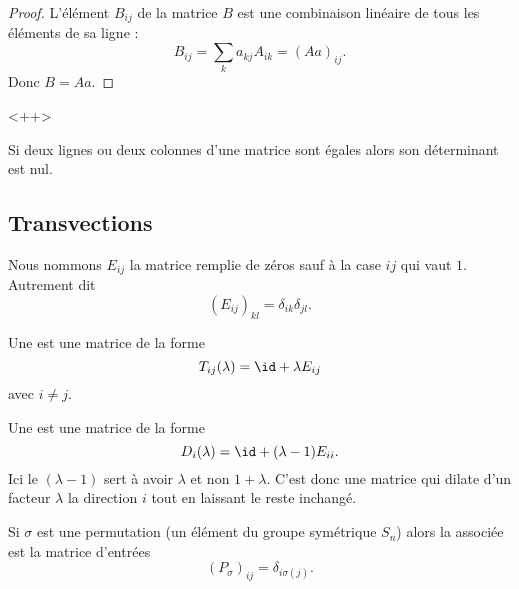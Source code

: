 \begin{proof}
    L'élément \( B_{ij}\) de la matrice \( B\) est une combinaison linéaire de tous les éléments de sa ligne :
    \begin{equation}
        B_{ij}=\sum_ka_{kj}A_{ik}=(Aa)_{ij}.
    \end{equation}
    Donc \( B=Aa\).
\end{proof}
<++>


\begin{proposition}     \label{PROPooLOQMooQzrZLH}
    Si deux lignes ou deux colonnes d'une matrice sont égales alors son déterminant est nul.
\end{proposition}

\subsection{Transvections}

Nous nommons \( E_{ij}\) la matrice remplie de zéros sauf à la case \( ij\) qui vaut \( 1\). Autrement dit
\begin{equation}
    (E_{ij})_{kl}=\delta_{ik}\delta_{jl}.
\end{equation}
\begin{definition}
    Une  est une matrice de la forme
    \begin{equation}
        T_{ij}(\lambda)=\id+\lambda E_{ij}
    \end{equation}
    avec \( i\neq j\).

    Une  est une matrice de la forme
    \begin{equation}
        D_i(\lambda)=\id+(\lambda-1)E_{ii}.
    \end{equation}
    Ici le \( (\lambda-1)\) sert à avoir \( \lambda\) et non \( 1+\lambda\). C'est donc une matrice qui dilate d'un facteur \( \lambda\) la direction \( i\) tout en laissant le reste inchangé.

    Si \( \sigma\) est une permutation (un élément du groupe symétrique \( S_n\)) alors la  associée est la matrice d'entrées
    \begin{equation}
        (P_{\sigma})_{ij}=\delta_{i\sigma(j)}.
    \end{equation}
\end{definition}

